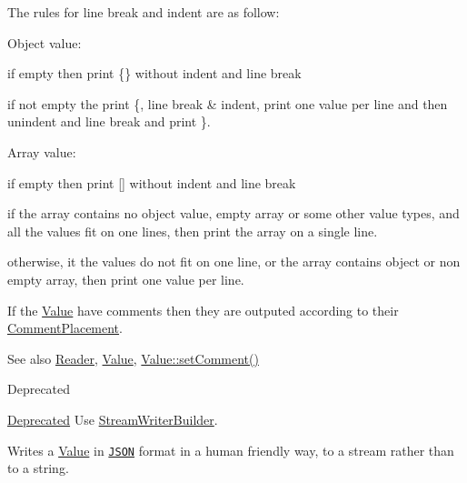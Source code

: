 The rules for line break and indent are as follow\+:
\begin{DoxyItemize}
\item Object value\+:
\begin{DoxyItemize}
\item if empty then print \{\} without indent and line break
\item if not empty the print \textquotesingle{}\{\textquotesingle{}, line break \& indent, print one value per line and then unindent and line break and print \textquotesingle{}\}\textquotesingle{}.
\end{DoxyItemize}
\item Array value\+:
\begin{DoxyItemize}
\item if empty then print \mbox{[}\mbox{]} without indent and line break
\item if the array contains no object value, empty array or some other value types, and all the values fit on one lines, then print the array on a single line.
\item otherwise, it the values do not fit on one line, or the array contains object or non empty array, then print one value per line.
\end{DoxyItemize}
\end{DoxyItemize}

If the \hyperlink{classJson_1_1Value}{Value} have comments then they are outputed according to their \hyperlink{namespaceJson_a4fc417c23905b2ae9e2c47d197a45351}{Comment\+Placement}.

\begin{DoxySeeAlso}{See also}
\hyperlink{classJson_1_1Reader}{Reader}, \hyperlink{classJson_1_1Value}{Value}, \hyperlink{classJson_1_1Value_a29f3a30f7e5d3af6f38d57999bf5b480}{Value\+::set\+Comment()} 
\end{DoxySeeAlso}
\begin{DoxyRefDesc}{Deprecated}
\item[\hyperlink{deprecated__deprecated000009}{Deprecated}]Use \hyperlink{classJson_1_1StreamWriterBuilder}{Stream\+Writer\+Builder}. \end{DoxyRefDesc}
Writes a \hyperlink{classJson_1_1Value}{Value} in \href{http://www.json.org}{\tt J\+S\+ON} format in a human friendly way, to a stream rather than to a string.

